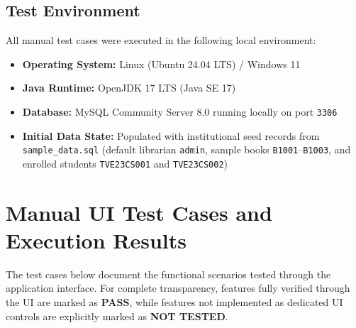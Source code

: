 \subsection{Test Environment}
All manual test cases were executed in the following local environment:
\begin{itemize}
    \item \textbf{Operating System:} Linux (Ubuntu 24.04 LTS) / Windows 11
    \item \textbf{Java Runtime:} OpenJDK 17 LTS (Java SE 17)
    \item \textbf{Database:} MySQL Community Server 8.0 running locally on port \texttt{3306}
    \item \textbf{Initial Data State:} Populated with institutional seed records from \texttt{sample\_data.sql} (default librarian \texttt{admin}, sample books \texttt{B1001}--\texttt{B1003}, and enrolled students \texttt{TVE23CS001} and \texttt{TVE23CS002})
\end{itemize}

\section{Manual UI Test Cases and Execution Results}

The test cases below document the functional scenarios tested through the application interface. For complete transparency, features fully verified through the UI are marked as \textbf{PASS}, while features not implemented as dedicated UI controls are explicitly marked as \textbf{NOT TESTED}.

